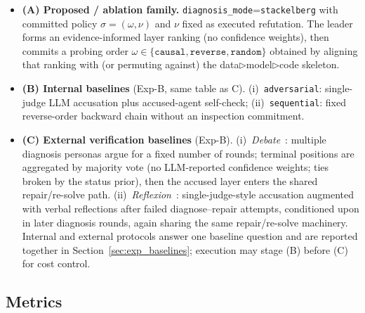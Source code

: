 \documentclass[a4paper,fleqn]{cas-sc}
\newcommand{\tri}{\triangleright}
\begin{document}
\begin{itemize}
    \item \textbf{(A) Proposed / ablation family.}
    \texttt{diagnosis\_mode}=\texttt{stackelberg} with committed policy
    $\sigma=(\omega,\nu)$ and $\nu$ fixed as executed refutation. The leader
    forms an evidence-informed layer ranking (no confidence weights), then
    commits a probing order $\omega\in\{\texttt{causal},\texttt{reverse},
    \texttt{random}\}$ obtained by aligning that ranking with
    (or permuting against) the data$\tri$model$\tri$code skeleton.
    \item \textbf{(B) Internal baselines} (Exp-B, same table as C).
    (i)~\texttt{adversarial}: single-judge LLM accusation plus accused-agent
    self-check; (ii)~\texttt{sequential}: fixed reverse-order backward chain
    without an inspection commitment.
    \item \textbf{(C) External verification baselines} (Exp-B).
    (i)~\emph{Debate}~\citep{du2023improving}: multiple diagnosis personas
    argue for a fixed number of rounds; terminal positions are aggregated by
    majority vote (no LLM-reported confidence weights; ties broken by the
    status prior), then the accused layer enters the shared repair/re-solve
    path. (ii)~\emph{Reflexion}~\citep{shinn2023reflexion}: single-judge-style
    accusation augmented with verbal reflections after failed
    diagnose--repair attempts, conditioned upon in later diagnosis rounds,
    again sharing the same repair/re-solve machinery.
    Internal and external protocols answer one baseline question and are
    reported together in Section~\ref{sec:exp_baselines}; execution may stage
    (B) before (C) for cost control.
\end{itemize}

\subsection{Metrics}
\label{sec:exp_metrics}
\end{document}
